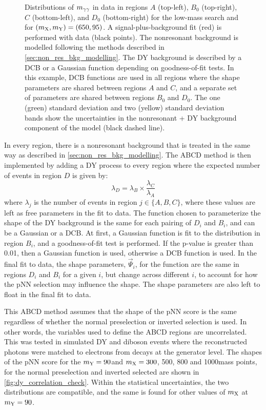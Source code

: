 \begin{figure}
  \caption[Distributions of \mgg in Different Regions of the DY ABCD Method]{Distributions of $m_{\gamma\gamma}$ in data in regions $A$ (top-left), $B_0$ (top-right), $C$ (bottom-left), and $D_0$ (bottom-right) for the low-mass \XYggHtt search and for $(m_{\mathrm{X}}, m_{\mathrm{Y}}) = (650, 95)$\GeV. A signal-plus-background fit (red) is performed with data (black points). The nonresonant background is modelled following the methods described in \cref{sec:non_res_bkg_modelling}. The DY background is described by a DCB or a Gaussian function depending on goodness-of-fit tests. In this example, DCB functions are used in all regions where the shape parameters are shared between regions $A$ and $C$, and a separate set of parameters are shared between regions $B_0$ and $D_0$. The one (green) standard deviation and two (yellow) standard deviation bands show the uncertainties in the nonresonant + DY background component of the model (black dashed line).}\label{fig:dy_cr_examples}
\end{figure}
  
In every region, there is a nonresonant background that is treated in the same way as described in \cref{sec:non_res_bkg_modelling}. The ABCD method is then implemented by adding a DY process to every region where the expected number of events in region $D$ is given by:
\begin{equation}
  \lambda_D = \lambda_B \times \frac{\lambda_C}{\lambda_A}
\end{equation} 
where $\lambda_j$ is the number of events in region $j \in \{A,B,C\}$, where these values are left as free parameters in the fit to data. The function chosen to parameterize the shape of the DY background is the same for each pairing of $D_i$ and $B_i$, and can be a Gaussian or a DCB. At first, a Gaussian function is fit to the \mgg distribution in region $B_i$, and a goodness-of-fit test is performed. If the p-value is greater than 0.01, then a Gaussian function is used, otherwise a DCB function is used. In the final fit to data, the shape parameters, $\vec{\Psi}_i$, for the function are the same in regions $D_i$ and $B_i$ for a given $i$, but change across different $i$, to account for how the pNN selection may influence the \mgg shape. The shape parameters are also left to float in the final fit to data. 

This ABCD method assumes that the shape of the pNN score is the same regardless of whether the normal preselection or inverted selection is used. In other words, the variables used to define the ABCD regions are uncorrelated. This was tested in simulated DY and diboson events where the reconstructed photons were matched to electrons from \Zee decays at the generator level. The shapes of the pNN score for the $m_{\mathrm{Y}}=90$\GeV and $m_{\mathrm{X}}=300$, 500, 800 and 1000\GeV mass points, for the normal preselection and inverted selected are shown in \cref{fig:dy_correlation_check}. Within the statistical uncertainties, the two distributions are compatible, and the same is found for other values of $m_{\mathrm{X}}$ at $m_{\mathrm{Y}}=90$\GeV.

